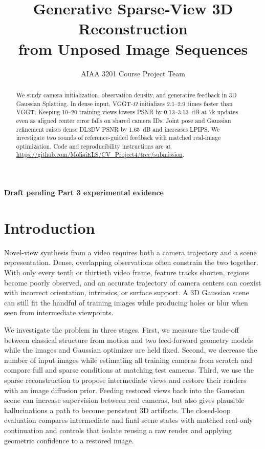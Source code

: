 \documentclass[10pt,twocolumn,letterpaper]{article}
\title{Generative Sparse-View 3D Reconstruction\\from Unposed Image Sequences}
\author{AIAA 3201 Course Project Team}
\newif\ifpartthreeevidence
\begin{document}
\maketitle
\raggedbottom
\ifpartthreeevidence\else
  \begin{center}\small\textbf{Draft pending Part 3 experimental evidence}\end{center}
\fi

\begin{abstract}
We study camera initialization, observation density, and generative feedback in 3D Gaussian Splatting. In dense input, VGGT-$\Omega$ initializes 2.1--2.9 times faster than VGGT. Keeping 10--20 training views lowers PSNR by 0.13--3.13~dB at 7k updates even as aligned center error falls on shared camera IDs. Joint pose and Gaussian refinement raises dense DL3DV PSNR by 1.65~dB and increases LPIPS. \ifpartthreeevidence\partthreeabstract\else We investigate two rounds of reference-guided feedback with matched real-image optimization.\fi{} Code and reproducibility instructions are at \url{https://github.com/MoliaiELS/CV_Project4/tree/submission}.
\end{abstract}

\section{Introduction}
Novel-view synthesis from a video requires both a camera trajectory and a scene representation. Dense, overlapping observations often constrain the two together. With only every tenth or thirtieth video frame, feature tracks shorten, regions become poorly observed, and an accurate trajectory of camera centers can coexist with incorrect orientation, intrinsics, or surface support. A 3D Gaussian scene can still fit the handful of training images while producing holes or blur when seen from intermediate viewpoints.

We investigate the problem in three stages. First, we measure the trade-off between classical structure from motion and two feed-forward geometry models while the images and Gaussian optimizer are held fixed. Second, we decrease the number of input images while estimating all training cameras from scratch and compare full and sparse conditions at matching test cameras. Third, we use the sparse reconstruction to propose intermediate views and restore their renders with an image diffusion prior. Feeding restored views back into the Gaussian scene can increase supervision between real cameras, but also gives plausible hallucinations a path to become persistent 3D artifacts. The closed-loop evaluation compares intermediate and final scene states with matched real-only continuation and controls that isolate reusing a raw render and applying geometric confidence to a restored image.
\end{document}
